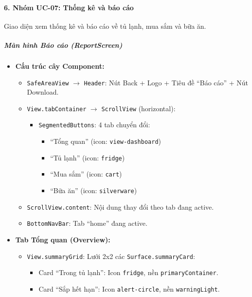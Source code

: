 \paragraph{6. Nhóm UC-07: Thống kê và báo cáo}
Giao diện xem thống kê và báo cáo về tủ lạnh, mua sắm và bữa ăn.

\subparagraph{Màn hình Báo cáo (ReportScreen)}
\begin{itemize}
    \item \textbf{Cấu trúc cây Component:}
        \begin{itemize}
            \item \texttt{SafeAreaView} $\rightarrow$ \texttt{Header}: Nút Back + Logo + Tiêu đề ``Báo cáo'' + Nút Download.
            \item \texttt{View.tabContainer} $\rightarrow$ \texttt{ScrollView} (horizontal):
                \begin{itemize}
                    \item \texttt{SegmentedButtons}: 4 tab chuyển đổi:
                        \begin{itemize}
                            \item ``Tổng quan'' (icon: \texttt{view-dashboard})
                            \item ``Tủ lạnh'' (icon: \texttt{fridge})
                            \item ``Mua sắm'' (icon: \texttt{cart})
                            \item ``Bữa ăn'' (icon: \texttt{silverware})
                        \end{itemize}
                \end{itemize}
            \item \texttt{ScrollView.content}: Nội dung thay đổi theo tab đang active.
            \item \texttt{BottomNavBar}: Tab ``home'' đang active.
        \end{itemize}
    \item \textbf{Tab Tổng quan (Overview):}
        \begin{itemize}
            \item \texttt{View.summaryGrid}: Lưới 2x2 các \texttt{Surface.summaryCard}:
                \begin{itemize}
                    \item Card ``Trong tủ lạnh'': Icon \texttt{fridge}, nền \texttt{primaryContainer}.
                    \item Card ``Sắp hết hạn'': Icon \texttt{alert-circle}, nền \texttt{warningLight}.

\end{itemize}
\end{itemize}
\end{itemize}
